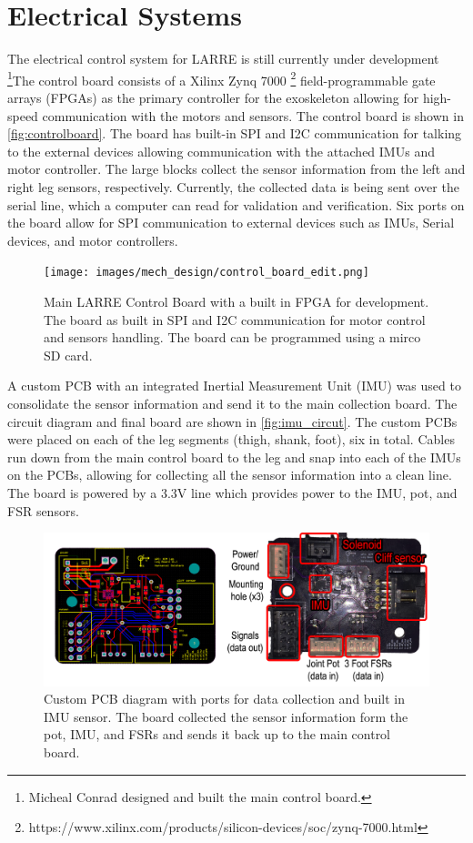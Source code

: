 \section{Electrical Systems}

The electrical control system for LARRE is still currently under development \footnote{Micheal Conrad designed and built the main control board.}The control board consists of a  Xilinx Zynq 7000 \footnote{https://www.xilinx.com/products/silicon-devices/soc/zynq-7000.html}  field-programmable gate arrays (FPGAs) as the primary controller for the exoskeleton allowing for high-speed communication with the motors and sensors. The control board is shown in \autoref{fig:controlboard}. The board has built-in SPI and I2C communication for talking to the external devices allowing communication with the attached IMUs and motor controller. The large blocks collect the sensor information from the left and right leg sensors, respectively. Currently, the collected data is being sent over the serial line, which a computer can read for validation and verification. Six ports on the board allow for SPI communication to external devices such as IMUs, Serial devices, and motor controllers. 


\begin{figure}
    \centering
    \texttt{[image: images/mech\_design/control\_board\_edit.png]}
    \caption[LARRE Control Board]{Main LARRE Control Board with a built in FPGA for development. The board as built in SPI and I2C communication for motor control and sensors handling. The board can be programmed using a mirco SD card. }
    \label{fig:controlboard}
\end{figure}


A custom PCB with an integrated Inertial Measurement Unit (IMU) was used to consolidate the sensor information and send it to the main collection board. The circuit diagram and final board are shown in \autoref{fig:imu_circut}. The custom PCBs were placed on each of the leg segments (thigh, shank, foot), six in total. Cables run down from the main control board to the leg and snap into each of the IMUs on the PCBs, allowing for collecting all the sensor information into a clean line. The board is powered by a 3.3V line which provides power to the IMU, pot, and FSR sensors.


\begin{figure}
    \centering
    \includegraphics[scale=0.23]{images/mech_design/IMU_diagram.png}
    \caption[Custom PCB Diagram]{Custom PCB diagram with ports for data collection and built in IMU sensor. The board collected the sensor information form the pot, IMU, and FSRs and sends it back up to the main control board.}
    \label{fig:imu_circut}
\end{figure}

